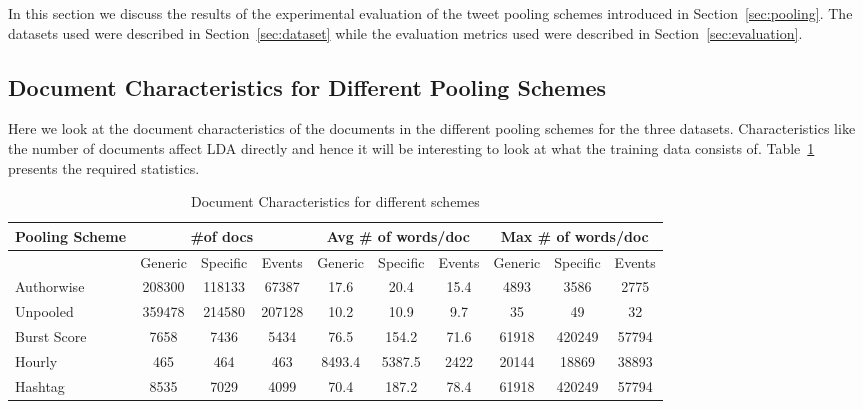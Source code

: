 \documentclass{sig-alternate}
\begin{document}
In this section we discuss the results of the experimental evaluation
of the tweet pooling schemes introduced in
Section~\ref{sec:pooling}. The datasets used were described in
Section~\ref{sec:dataset} while the evaluation metrics used were
described in Section~\ref{sec:evaluation}.

\label{sec:init_results}

\subsection{Document Characteristics for Different Pooling Schemes}

Here we look at the document characteristics of the documents in the
different pooling schemes for the three datasets. Characteristics
like the number of documents affect LDA directly and hence it will be
interesting to look at what the training data consists
of. Table~\ref{tbl-3} presents the required statistics.

{
\begin{table}[!ht]
\centering
\resizebox{14cm}{!} 
{
	\begin{tabular}{|l|ccc|ccc|ccc|}
	\hline
	Pooling Scheme  & \multicolumn {3}{c|}{\#of docs} & \multicolumn {3}{c|}{Avg \# of words/doc} & \multicolumn {3}{c|}{Max \# of words/doc}\\
	\hline
	 & Generic & Specific & Events &  Generic & Specific & Events &  Generic & Specific & Events\\
	\hline
	Authorwise & 208300 & 118133 & 67387 & 17.6 & 20.4 & 15.4 & 4893 & 3586 & 2775 \\
	\hline
	Unpooled & 359478 & 214580 & 207128 & 10.2 & 10.9 & 9.7 & 35 & 49 & 32 \\
	\hline
	Burst Score & 7658 & 7436 & 5434 & 76.5 & 154.2 & 71.6 & 61918 & 420249 & 57794 \\
	\hline
	Hourly & 465 & 464 & 463 & 8493.4 & 5387.5 & 2422 & 20144 & 18869 & 38893 \\
	\hline
	Hashtag & 8535 & 7029 & 4099 & 70.4 & 187.2 & 78.4 & 61918 & 420249 & 57794 \\
	\hline
	\end{tabular}
}
\caption{Document Characteristics for different schemes}\label{tbl-3}
\end{table}
}
\end{document}
